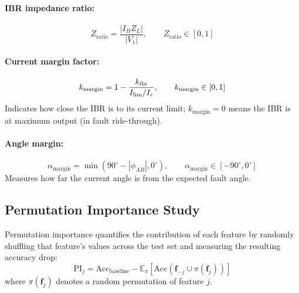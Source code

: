\paragraph{IBR impedance ratio:}
\begin{equation}
  Z_\mathrm{ratio} = \frac{|I_B Z_L|}{|V_1|}, \qquad Z_\mathrm{ratio} \in [0, 1]
  \label{eq:ch8_zratio}
\end{equation}

\paragraph{Current margin factor:}
\begin{equation}
  k_\mathrm{margin} = 1 - \frac{k_\mathrm{ibr}}{I_\mathrm{lim}/I_r}, \qquad
  k_\mathrm{margin} \in [0, 1]
  \label{eq:ch8_kmargin}
\end{equation}
Indicates how close the IBR is to its current limit; $k_\mathrm{margin} = 0$
means the IBR is at maximum output (in fault ride-through).

\paragraph{Angle margin:}
\begin{equation}
  \alpha_\mathrm{margin} = \min(90^\circ{} - |\phi_{AB}|, 0^\circ{}), \qquad
  \alpha_\mathrm{margin} \in [-90^\circ{}, 0^\circ{}]
  \label{eq:ch8_amargin}
\end{equation}
Measures how far the current angle is from the expected fault angle.

\subsection{Permutation Importance Study}

Permutation importance quantifies the contribution of each feature by
randomly shuffling that feature's values across the test set and measuring
the resulting accuracy drop:
\begin{equation}
  \mathrm{PI}_j = \mathrm{Acc}_\mathrm{baseline}
    - \mathbb{E}_\pi[\mathrm{Acc}(\mathbf{f}_{-j} \cup \pi(\mathbf{f}_j))]
  \label{eq:ch8_pi}
\end{equation}
where $\pi(\mathbf{f}_j)$ denotes a random permutation of feature $j$.

